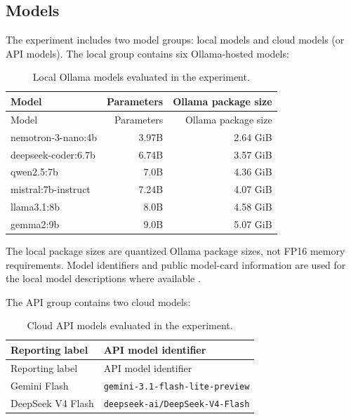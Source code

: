 \documentclass{llncs}
\begin{document}
\subsection{Models}\label{models}

The experiment includes two model groups: local models and cloud models (or API models). The local group contains six Ollama-hosted models:

\begin{longtable}[]{@{}lrr@{}}
\caption{Local Ollama models evaluated in the
experiment.}\tabularnewline
\toprule\noalign{}
Model & Parameters & Ollama package size \\
\midrule\noalign{}
\endfirsthead
\toprule\noalign{}
Model & Parameters & Ollama package size \\
\midrule\noalign{}
\endhead
\bottomrule\noalign{}
\endlastfoot
nemotron-3-nano:4b & 3.97B & 2.64 GiB \\
deepseek-coder:6.7b & 6.74B & 3.57 GiB \\
qwen2.5:7b & 7.0B & 4.36 GiB \\
mistral:7b-instruct & 7.24B & 4.07 GiB \\
llama3.1:8b & 8.0B & 4.58 GiB \\
gemma2:9b & 9.0B & 5.07 GiB \\
\end{longtable}

The local package sizes are quantized Ollama package sizes, not FP16 memory requirements. Model identifiers and public model-card information are used for the local model descriptions where available \citep{nemotron3nano2026, deepseekcoder2023, qwen25release2024, mistral7b2023, llama31modelcard2024, gemma2release2024}.

The API group contains two cloud models:

\begin{longtable}[]{@{}ll@{}}
\caption{Cloud API models evaluated in the experiment.}\tabularnewline
\toprule\noalign{}
Reporting label & API model identifier \\
\midrule\noalign{}
\endfirsthead
\toprule\noalign{}
Reporting label & API model identifier \\
\midrule\noalign{}
\endhead
\bottomrule\noalign{}
\endlastfoot
Gemini Flash & \texttt{gemini-3.1-flash-lite-preview} \\
DeepSeek V4 Flash & \texttt{deepseek-ai/DeepSeek-V4-Flash} \\
\end{longtable}
\end{document}

